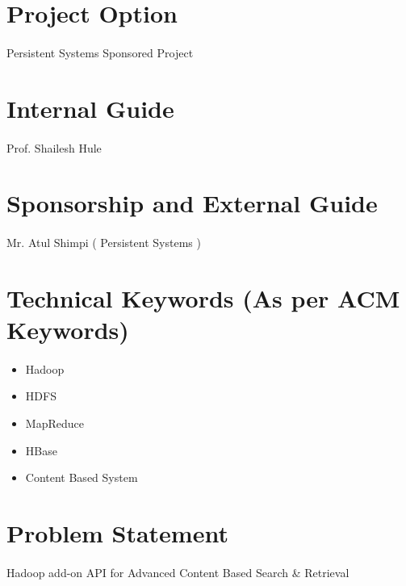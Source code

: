 \documentclass[oneside,a4paper,12pt]{report}
\begin{document}
\section{Project Option}
\paragraph{}
Persistent Systems Sponsored Project

\section{Internal Guide}
\paragraph{} 
Prof. Shailesh Hule 

\section{Sponsorship and External Guide}
\paragraph{} 
Mr. Atul Shimpi ( Persistent Systems ) 

\section{Technical Keywords (As per ACM Keywords)}
\paragraph{}

\begin{itemize}
\item Hadoop
\item HDFS
\item MapReduce
\item HBase
\item Content Based System
\end{itemize}

\section{Problem Statement}
\paragraph{} 
Hadoop add-on API for Advanced Content Based Search \& Retrieval
\end{document}
